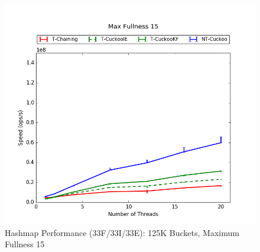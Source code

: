 \begin{figure}[H]
    \centering
	\begin{minipage}{0.5\textwidth}\includegraphics[width=\textwidth]{maps/15HM125K:F34,I33,E33.png} 
    \end{minipage}
	\begin{minipage}{0.4\textwidth}
    
    \end{minipage}
    \caption{Hashmap Performance (33F/33I/33E): 125K Buckets, Maximum Fullness 15}
\end{figure}

